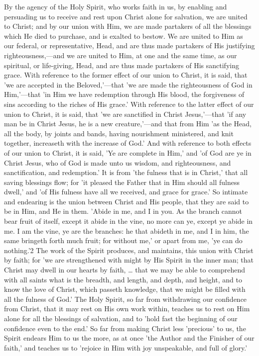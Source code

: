 \documentclass[
]{book}
\begin{document}
By the agency of the Holy Spirit, who works faith in us, by enabling and persuading us to receive and rest upon Christ alone for salvation, we are united to Christ; and by our union with Him, we are made partakers of all the blessings which He died to purchase, and is exalted to bestow. We are united to Him as our federal, or representative, Head, and are thus made partakers of His justifying righteousness,---and we are united to Him, at one and the same time, as our spiritual, or life-giving, Head, and are thus made partakers of His sanctifying grace. With reference to the former effect of our union to Christ, it is said, that 'we are accepted in the Beloved,'---that 'we are made the righteousness of God in Him,'---that 'in Him we have redemption through His blood, the forgiveness of sins according to the riches of His grace.' With reference to the latter effect of our union to Christ, it is said, that 'we are sanctified in Christ Jesus,'---that 'if any man be in Christ Jesus, he is a new creature,'---and that from Him 'as the Head, all the body, by joints and bands, having nourishment ministered, and knit together, increaseth with the increase of God.' And with reference to both effects of our union to Christ, it is said, 'Ye are complete in Him,' and 'of God are ye in Christ Jesus, who of God is made unto us wisdom, and righteousness, and sanctification, and redemption.' It is from 'the fulness that is in Christ,' that all saving blessings flow; for 'it pleased the Father that in Him should all fulness dwell,' and 'of His fulness have all we received, and grace for grace.' So intimate and endearing is the union between Christ and His people, that they are said to be in Him, and He in them. 'Abide in me, and I in you. As the branch cannot bear fruit of itself, except it abide in the vine, no more can ye, except ye abide in me. I am the vine, ye are the branches: he that abideth in me, and I in him, the same bringeth forth much fruit; for without me,' or apart from me, 'ye can do nothing.'2 The work of the Spirit produces, and maintains, this union with Christ by faith; for 'we are strengthened with might by His Spirit in the inner man; that Christ may dwell in our hearts by faith, \ldots{} that we may be able to comprehend with all saints what is the breadth, and length, and depth, and height, and to know the love of Christ, which passeth knowledge, that we might be filled with all the fulness of God.' The Holy Spirit, so far from withdrawing our confidence from Christ, that it may rest on His own work within, teaches us to rest on Him alone for all the blessings of salvation, and to 'hold fast the beginning of our confidence even to the end.' So far from making Christ less 'precious' to us, the Spirit endears Him to us the more, as at once 'the Author and the Finisher of our faith,' and teaches us to 'rejoice in Him with joy unspeakable, and full of glory.'
\end{document}
